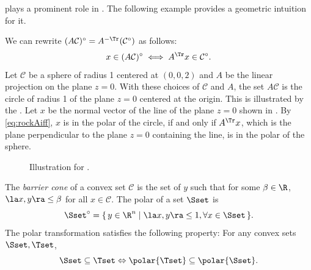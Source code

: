 \documentclass[11pt,twoside,a4paper,openright]{uclouvain-thesis}
\newcommand{\Cset}{\mathcal{C}}
\begin{document}
 plays a prominent role in .
The following example provides a geometric intuition for it.

\begin{myexem}
  \label{exem:rockA}
  We can rewrite $(A\Cset)^\circ = A^{-\Tr}(\Cset^\circ)$
  as follows:
  \begin{equation}
    \label{eq:rockAiff}
    x \in (A\Cset)^\circ \iff A^\Tr x \in \Cset^\circ.
  \end{equation}
  Let $\Cset$ be a sphere of radius 1 centered at $(0,0,2)$ and $A$ be the linear projection on the plane $z = 0$.
  With these choices of $\Cset$ and $A$, the set $A\Cset$ is the circle of radius 1 of the plane $z = 0$ centered at the origin.
  This is illustrated by the .
  Let $x$ be the normal vector of the line of the plane $z = 0$ shown in .
  By \eqref{eq:rockAiff}, $x$ is in the polar of the circle, if and only if
  $A^\Tr x$, which is the plane perpendicular to the plane $z = 0$ containing the line,
  is in the polar of the sphere.
\end{myexem}

\begin{figure}
  \centering
  \caption{Illustration for .}
  \label{fig:rockA}
\end{figure}

The \emph{barrier cone} of a convex set $\Cset$ is the set of $y$ such that for some $\beta \in \R$, $\la x, y \ra \leq \beta$ for all $x \in \Cset$.
The polar of a set $\Sset$ is
\[ \Sset^\circ = \{\, y \in \R^n \mid \la x, y \ra \leq 1, \forall x \in \Sset \,\}. \]
The polar transformation satisfies the following property:
For any convex sets $\Sset, \Tset$,
\begin{equation}
  \label{eq:revincl}
  \Sset \subseteq \Tset \Leftrightarrow \polar{\Tset} \subseteq \polar{\Sset}.
\end{equation}
\end{document}

